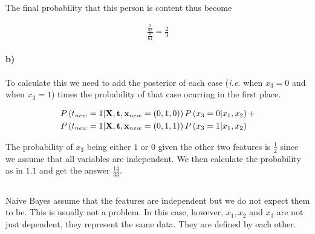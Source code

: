 \documentclass{article}
\begin{document}
The final probability that this person is content thus become

\begin{align}
  \frac{\frac{3}{32}}{\frac{9}{64}} = \frac{2}{3}
\end{align}

\paragraph{b)}

To calculate this we need to add the posterior of each case (\emph{i.e.} when
$x_3 = 0$ and when $x_3 = 1$) times the probability of that case ocurring in
the first place.

\begin{align}
  &P\left( t_{new} = 1 \vert \mathbf{X}, \mathbf{t}, \mathbf{x}_{new} = (0, 1, 0) \right) P \left( x_3 = 0  \vert x_1, x_2 \right) + \\
  \notag &P\left( t_{new} = 1 \vert \mathbf{X}, \mathbf{t}, \mathbf{x}_{new} = (0, 1, 1) \right) P \left( x_3 = 1  \vert x_1, x_2 \right)
\end{align}

The probability of $x_3$ being either $1$ or $0$ given the other two features is
$\frac{1}{2}$ since we assume that all variables are independent. We then calculate the probability as in $1.1$ and get the answer $\frac{14}{33}$.

%
%
%

\subsection{}

Naive Bayes assume that the features are independent but we do not
expect them to be. This is usually not a problem. In this case, however,
$x_1, x_2$ and $x_3$ are not just dependent, they represent the same data.
They are defined by each other.
\end{document}
